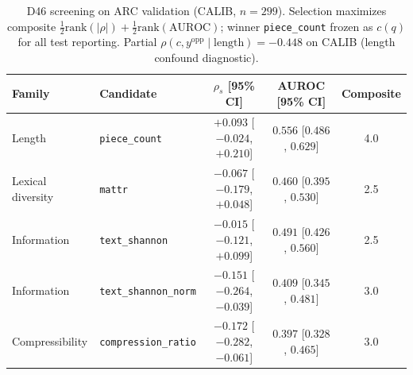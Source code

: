 \begin{table}[t]
  \centering
  \small
  \begin{tabular}{llccc}
    \toprule
    \textbf{Family} & \textbf{Candidate} & $\rho_s$ [95\% CI] & AUROC [95\% CI] & Composite \\
    \midrule
    Length & \texttt{piece\_count} & $+0.093$ [$-0.024$, $+0.210$] & $0.556$ [$0.486$, $0.629$] & 4.0 \\
    Lexical diversity & \texttt{mattr} & $-0.067$ [$-0.179$, $+0.048$] & $0.460$ [$0.395$, $0.530$] & 2.5 \\
    Information & \texttt{text\_shannon} & $-0.015$ [$-0.121$, $+0.099$] & $0.491$ [$0.426$, $0.560$] & 2.5 \\
    Information & \texttt{text\_shannon\_norm} & $-0.151$ [$-0.264$, $-0.039$] & $0.409$ [$0.345$, $0.481$] & 3.0 \\
    Compressibility & \texttt{compression\_ratio} & $-0.172$ [$-0.282$, $-0.061$] & $0.397$ [$0.328$, $0.465$] & 3.0 \\
    \bottomrule
  \end{tabular}
  \caption{D46 screening on ARC validation (CALIB, $n{=}299$). Selection maximizes composite $\tfrac{1}{2}\mathrm{rank}(|\rho|)+\tfrac{1}{2}\mathrm{rank}(\mathrm{AUROC})$; winner \texttt{piece\_count} frozen as $c(q)$ for all test reporting. Partial $\rho(c,y^{\text{opp}}\mid\text{length})=-0.448$ on CALIB (length confound diagnostic).}
  \label{tab:d46}
\end{table}
